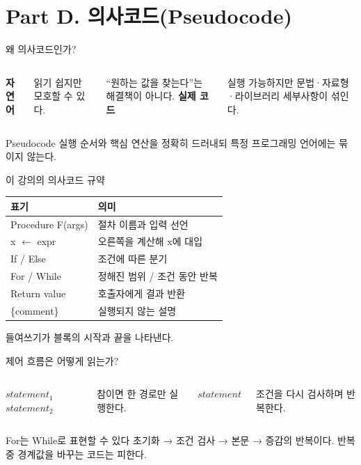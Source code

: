 \section{Part D. 의사코드(Pseudocode)}

\begin{frame}{왜 의사코드인가?}
  \begin{columns}[T,onlytextwidth]
      \textbf{자연어}\par
      읽기 쉽지만 모호할 수 있다.\par\medskip
      \alert{``원하는 값을 찾는다''}는 해결책이 아니다.
      \textbf{실제 코드}\par
      실행 가능하지만 문법·자료형·라이브러리 세부사항이 섞인다.
  \end{columns}
  \vfill
  \begin{block}{Pseudocode}
    실행 순서와 핵심 연산을 정확히 드러내되 특정 프로그래밍 언어에는 묶이지 않는다.
  \end{block}
\end{frame}

\begin{frame}{이 강의의 의사코드 규약}
  \begin{tabular}{@{}>{\ttfamily}p{}p{}@{}}
    \toprule
    표기 & 의미 \\
    \midrule
    Procedure F(args) & 절차 이름과 입력 선언 \\
    x $\gets$ expr & 오른쪽을 계산해 x에 대입 \\
    If / Else & 조건에 따른 분기 \\
    For / While & 정해진 범위 / 조건 동안 반복 \\
    Return value & 호출자에게 결과 반환 \\
    \{comment\} & 실행되지 않는 설명 \\
    \bottomrule
  \end{tabular}
  \vfill
  들여쓰기가 블록의 시작과 끝을 나타낸다.
\end{frame}

\begin{frame}[fragile]{제어 흐름은 어떻게 읽는가?}
  \begin{columns}[T,onlytextwidth]
    \begin{algorithmic}[1]
        \State $statement_1$
      \Else
        \State $statement_2$
      \EndIf
    \end{algorithmic}
    참이면 한 경로만 실행한다.
    \begin{algorithmic}[1]
        \State $statement$
      \EndWhile
    \end{algorithmic}
    조건을 다시 검사하며 반복한다.
  \end{columns}
  \vfill
  \begin{block}{For는 While로 표현할 수 있다}
    초기화 → 조건 검사 → 본문 → 증감의 반복이다. 반복 중 경계값을 바꾸는 코드는 피한다.
  \end{block}
\end{frame}

